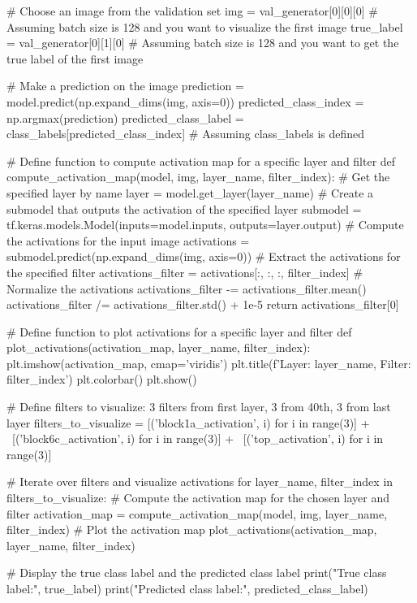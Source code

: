 \begin{python}[caption={Python code for training the model}]
# Choose an image from the validation set
img = val_generator[0][0][0]  # Assuming batch size is 128 and you want to visualize the first image
true_label = val_generator[0][1][0]  # Assuming batch size is 128 and you want to get the true label of the first image

# Make a prediction on the image
prediction = model.predict(np.expand_dims(img, axis=0))
predicted_class_index = np.argmax(prediction)
predicted_class_label = class_labels[predicted_class_index]  # Assuming class_labels is defined

# Define function to compute activation map for a specific layer and filter
def compute_activation_map(model, img, layer_name, filter_index):
    # Get the specified layer by name
    layer = model.get_layer(layer_name)
    # Create a submodel that outputs the activation of the specified layer
    submodel = tf.keras.models.Model(inputs=model.inputs, outputs=layer.output)
    # Compute the activations for the input image
    activations = submodel.predict(np.expand_dims(img, axis=0))
    # Extract the activations for the specified filter
    activations_filter = activations[:, :, :, filter_index]
    # Normalize the activations
    activations_filter -= activations_filter.mean()
    activations_filter /= activations_filter.std() + 1e-5
    return activations_filter[0]

# Define function to plot activations for a specific layer and filter
def plot_activations(activation_map, layer_name, filter_index):
    plt.imshow(activation_map, cmap='viridis')
    plt.title(f'Layer: {layer_name}, Filter: {filter_index}')
    plt.colorbar()
    plt.show()
    
# Define filters to visualize: 3 filters from first layer, 3 from 40th, 3 from last layer
filters_to_visualize = [('block1a_activation', i) for i in range(3)] + \
                       [('block6c_activation', i) for i in range(3)] + \
                       [('top_activation', i) for i in range(3)]

# Iterate over filters and visualize activations
for layer_name, filter_index in filters_to_visualize:
    # Compute the activation map for the chosen layer and filter
    activation_map = compute_activation_map(model, img, layer_name, filter_index)
    # Plot the activation map
    plot_activations(activation_map, layer_name, filter_index)

# Display the true class label and the predicted class label
print("True class label:", true_label)
print("Predicted class label:", predicted_class_label)

\end{python}


